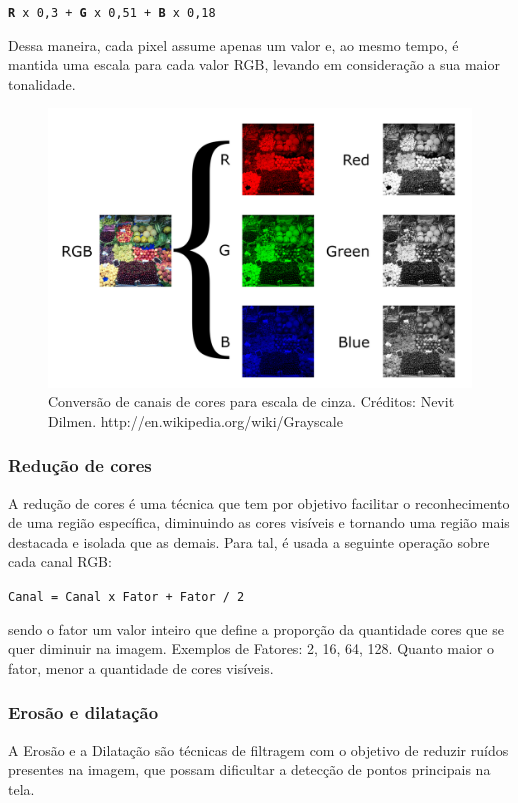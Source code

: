 \documentclass[12pt]{article}
\begin{document}
\texttt{\small \textbf{R} x 0,3 + \textbf{G} x 0,51 + \textbf{B} x 0,18}

\noindent Dessa maneira, cada pixel assume apenas um valor e, ao mesmo tempo, \'e mantida uma escala para cada valor RGB,
levando em considera\c c\~ao a sua maior tonalidade.

	\begin{figure}[ht!]
	\begin{center}
		\includegraphics[scale=1.0]{img/1200px-Beyoglu_4671_tricolor.png}
		\footnotesize \caption{Convers\~ao de canais de cores para escala de cinza. Cr\'editos: Nevit Dilmen. http://en.wikipedia.org/wiki/Grayscale }
	\end{center}
	\end{figure}	


\subsubsection{Redu\c c\~ao de cores}
A redu\c c\~ao de cores \'e uma t\'ecnica que tem por objetivo facilitar o reconhecimento de uma regi\~ao espec\'ifica,
diminuindo as cores vis\'iveis e tornando uma regi\~ao mais destacada e isolada que as demais.
Para tal, \'e usada a seguinte opera\c c\~ao sobre cada canal RGB:

\texttt{\small Canal = Canal x Fator + Fator / 2}

\noindent sendo o fator um valor inteiro que define a propor\c c\~ao da quantidade cores que se quer diminuir na imagem.
Exemplos de Fatores: 2, 16, 64, 128. Quanto maior o fator, menor a quantidade de cores vis\'iveis.

\subsubsection{Eros\~ao e dilata\c c\~ao}
A Eros\~ao e a Dilata\c c\~ao s\~ao t\'ecnicas de filtragem com o objetivo de reduzir ru\'idos presentes na imagem,
que possam dificultar a detec\c c\~ao de pontos principais na tela.
\end{document}
